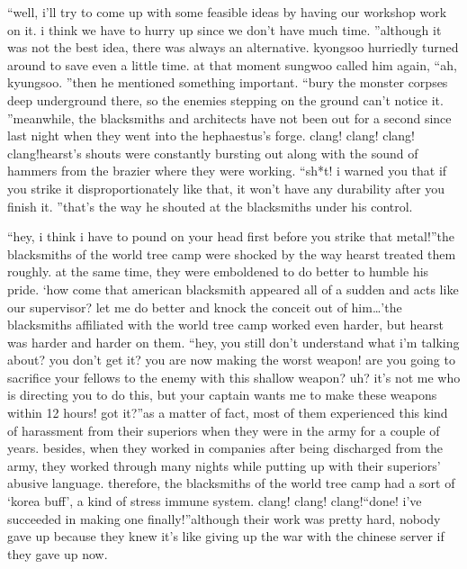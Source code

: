 “well, i’ll try to come up with some feasible ideas by having our workshop work on it.
 i think we have to hurry up since we don’t have much time.
”although it was not the best idea, there was always an alternative.
kyongsoo hurriedly turned around to save even a little time.
at that moment sungwoo called him again, “ah, kyungsoo.
”then he mentioned something important.
“bury the monster corpses deep underground there, so the enemies stepping on the ground can’t notice it.
”meanwhile, the blacksmiths and architects have not been out for a second since last night when they went into the hephaestus’s forge.
clang! clang! clang! clang!hearst’s shouts were constantly bursting out along with the sound of hammers from the brazier where they were working.
“sh*t! i warned you that if you strike it disproportionately like that, it won’t have any durability after you finish it.
”that’s the way he shouted at the blacksmiths under his control.


“hey, i think i have to pound on your head first before you strike that metal!”the blacksmiths of the world tree camp were shocked by the way hearst treated them roughly.
 at the same time, they were emboldened to do better to humble his pride.
‘how come that american blacksmith appeared all of a sudden and acts like our supervisor? let me do better and knock the conceit out of him…’the blacksmiths affiliated with the world tree camp worked even harder, but hearst was harder and harder on them.
“hey, you still don’t understand what i’m talking about? you don’t get it? you are now making the worst weapon! are you going to sacrifice your fellows to the enemy with this shallow weapon? uh? it’s not me who is directing you to do this, but your captain wants me to make these weapons within 12 hours! got it?”as a matter of fact, most of them experienced this kind of harassment from their superiors when they were in the army for a couple of years.
 besides, when they worked in companies after being discharged from the army, they worked through many nights while putting up with their superiors’ abusive language.
therefore, the blacksmiths of the world tree camp had a sort of ‘korea buff’, a kind of stress immune system.
clang! clang! clang!“done! i’ve succeeded in making one finally!”although their work was pretty hard, nobody gave up because they knew it’s like giving up the war with the chinese server if they gave up now.


 